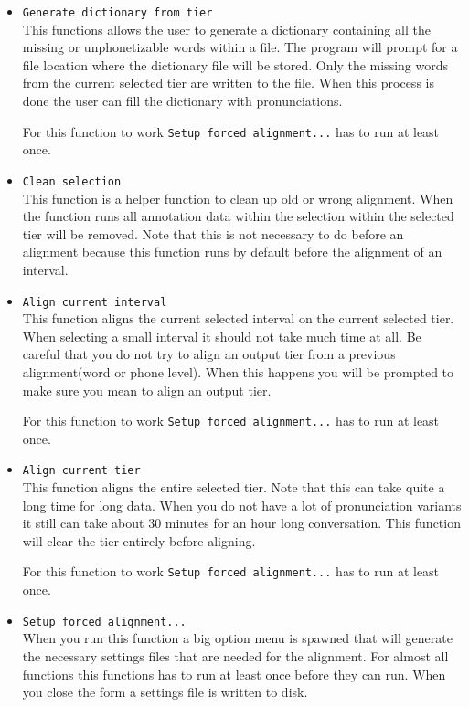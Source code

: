 \documentclass[twoside,a4paper]{book}
\begin{document}
\begin{itemize}
	\item \texttt{Generate dictionary from tier}\\
		This functions allows the user to generate a dictionary containing all the
		missing or unphonetizable words within a file. The program will prompt for
		a file location where the dictionary file will be stored. Only the missing
		words from the current selected tier are written to the file. When this
		process is done the user can fill the dictionary with pronunciations.

		For this function to work \texttt{Setup forced alignment...} has to run
		at least once.
	\item \texttt{Clean selection}\\
		This function is a helper function to clean up old or wrong alignment. When
		the function runs all annotation data within the selection within the
		selected tier will be removed. Note that this is not necessary to do before
		an alignment because this function runs by default before the alignment of
		an interval.
	\item \texttt{Align current interval}\\
		This function aligns the current selected interval on the current selected
		tier. When selecting a small interval it should not take much time at all.
		Be careful that you do not try to align an output tier from a previous
		alignment(word or phone level). When this happens you will be prompted to
		make sure you mean to align an output tier.

		For this function to work \texttt{Setup forced alignment...} has to run
		at least once.
	\item \texttt{Align current tier}\\
		This function aligns the entire selected tier. Note that this can take
		quite a long time for long data. When you do not have a lot of
		pronunciation variants it still can take about $30$ minutes for an hour
		long conversation. This function will clear the tier entirely before
		aligning.

		For this function to work \texttt{Setup forced alignment...} has to run
		at least once.
	\item \texttt{Setup forced alignment...}\\
		When you run this function a big option menu is spawned that will generate
		the necessary settings files that are needed for the alignment. For almost
		all functions this functions has to run at least once before they can run.
		When you close the form a settings file is written to disk.


\end{itemize}
\end{document}
